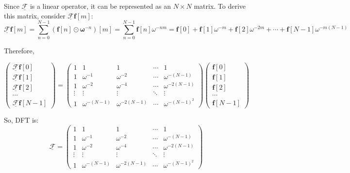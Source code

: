 \documentclass{article}
\begin{document}
Since $\underline{\mathscr{F}}$ is a linear operator, it can be represented as an $N\times N$ matrix. To derive this matrix, consider $\underline{\mathscr{F}}\mathbf{f}[m]$:
\begin{equation}
    \underline{\mathscr{F}}\mathbf{f}[m] = \sum_{n=0}^{N-1} \left( \mathbf{f}[n] \odot \boldsymbol{\omega}^{-n} \right) [m] = \sum_{n=0}^{N-1} \mathbf{f}[n] \omega^{-nm} = \mathbf{f}[0] + \mathbf{f}[1] \omega^{-m} + \mathbf{f}[2] \omega^{-2m} + \cdots + \mathbf{f}[N-1] \omega^{-m(N-1)} 
\end{equation}

Therefore,

\begin{equation}
    \begin{pmatrix}
        \underline{\mathscr{F}}\mathbf{f}[0] \\     
        \underline{\mathscr{F}}\mathbf{f}[1] \\     
        \underline{\mathscr{F}}\mathbf{f}[2] \\    
        \cdots \\
        \underline{\mathscr{F}}\mathbf{f}[N-1]  
    \end{pmatrix} = 
    \begin{pmatrix}
        1 & 1 & 1 & \cdots & 1 \\
        1 & \omega^{-1} & \omega^{-2} & \cdots & \omega^{-(N-1)} \\
        1 & \omega^{-2} & \omega^{-4} & \cdots & \omega^{-2(N-1)} \\
        \vdots & \vdots & \vdots & \ddots & \vdots \\
        1 & \omega^{-(N-1)} & \omega^{-2(N-1)} & \cdots & \omega^{-(N-1)^2}
    \end{pmatrix}  
    \begin{pmatrix}
        \mathbf{f}[0] \\    
        \mathbf{f}[1] \\    
        \mathbf{f}[2] \\    
        \cdots \\
        \mathbf{f}[N-1]    
    \end{pmatrix}  
\end{equation}

So, DFT is:
\begin{equation}
    \underline{\mathscr{F}} = 
    \begin{pmatrix}
        1 & 1 & 1 & \cdots & 1 \\
        1 & \omega^{-1} & \omega^{-2} & \cdots & \omega^{-(N-1)} \\
        1 & \omega^{-2} & \omega^{-4} & \cdots & \omega^{-2(N-1)} \\
        \vdots & \vdots & \vdots & \ddots & \vdots \\
        1 & \omega^{-(N-1)} & \omega^{-2(N-1)} & \cdots & \omega^{-(N-1)^2}
    \end{pmatrix}  
\end{equation}
\end{document}
